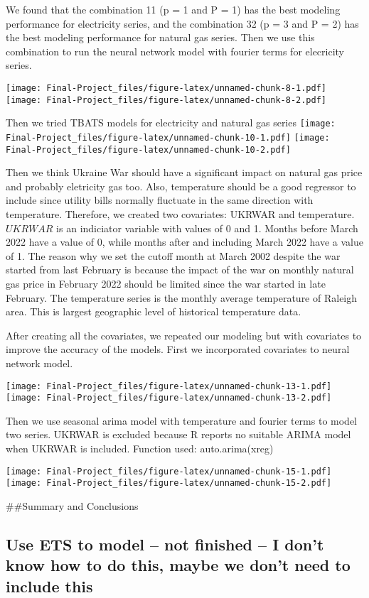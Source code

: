 \documentclass[
]{article}
\begin{document}
We found that the combination 11 (p = 1 and P = 1) has the best modeling
performance for electricity series, and the combination 32 (p = 3 and P
= 2) has the best modeling performance for natural gas series. Then we
use this combination to run the neural network model with fourier terms
for elecricity series.

\texttt{[image: Final-Project\_files/figure-latex/unnamed-chunk-8-1.pdf]}
\texttt{[image: Final-Project\_files/figure-latex/unnamed-chunk-8-2.pdf]}

Then we tried TBATS models for electricity and natural gas series
\texttt{[image: Final-Project\_files/figure-latex/unnamed-chunk-10-1.pdf]}
\texttt{[image: Final-Project\_files/figure-latex/unnamed-chunk-10-2.pdf]}

Then we think Ukraine War should have a significant impact on natural
gas price and probably eletricity gas too. Also, temperature should be a
good regressor to include since utility bills normally fluctuate in the
same direction with temperature. Therefore, we created two covariates:
UKRWAR and temperature. \(UKRWAR\) is an indiciator variable with values
of 0 and 1. Months before March 2022 have a value of 0, while months
after and including March 2022 have a value of 1. The reason why we set
the cutoff month at March 2002 despite the war started from last
February is because the impact of the war on monthly natural gas price
in February 2022 should be limited since the war started in late
February. The temperature series is the monthly average temperature of
Raleigh area. This is largest geographic level of historical temperature
data.

After creating all the covariates, we repeated our modeling but with
covariates to improve the accuracy of the models. First we incorporated
covariates to neural network model.

\texttt{[image: Final-Project\_files/figure-latex/unnamed-chunk-13-1.pdf]}
\texttt{[image: Final-Project\_files/figure-latex/unnamed-chunk-13-2.pdf]}

Then we use seasonal arima model with temperature and fourier terms to
model two series. UKRWAR is excluded because R reports no suitable ARIMA
model when UKRWAR is included. Function used: auto.arima(xreg)

\texttt{[image: Final-Project\_files/figure-latex/unnamed-chunk-15-1.pdf]}
\texttt{[image: Final-Project\_files/figure-latex/unnamed-chunk-15-2.pdf]}

\#\#Summary and Conclusions

\hypertarget{use-ets-to-model-not-finished-i-dont-know-how-to-do-this-maybe-we-dont-need-to-include-this}{%
\subsection{Use ETS to model -- not finished -- I don't know how to do
this, maybe we don't need to include
this}\label{use-ets-to-model-not-finished-i-dont-know-how-to-do-this-maybe-we-dont-need-to-include-this}}
\end{document}
